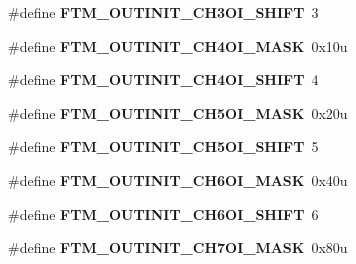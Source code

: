 \begin{DoxyCompactItemize}
\item 
\hypertarget{group___f_t_m___register___masks_ga083d497bae99715e175c5e73e27d3313}{}\#define {\bfseries F\+T\+M\+\_\+\+O\+U\+T\+I\+N\+I\+T\+\_\+\+C\+H3\+O\+I\+\_\+\+S\+H\+I\+F\+T}~3\label{group___f_t_m___register___masks_ga083d497bae99715e175c5e73e27d3313}

\item 
\hypertarget{group___f_t_m___register___masks_gab451c20f7002deae668749b6a886ca84}{}\#define {\bfseries F\+T\+M\+\_\+\+O\+U\+T\+I\+N\+I\+T\+\_\+\+C\+H4\+O\+I\+\_\+\+M\+A\+S\+K}~0x10u\label{group___f_t_m___register___masks_gab451c20f7002deae668749b6a886ca84}

\item 
\hypertarget{group___f_t_m___register___masks_gac61997ec656e9289b6b9b4a6df30b548}{}\#define {\bfseries F\+T\+M\+\_\+\+O\+U\+T\+I\+N\+I\+T\+\_\+\+C\+H4\+O\+I\+\_\+\+S\+H\+I\+F\+T}~4\label{group___f_t_m___register___masks_gac61997ec656e9289b6b9b4a6df30b548}

\item 
\hypertarget{group___f_t_m___register___masks_gaa0956e031b19115b7f91bf0138ef8dfe}{}\#define {\bfseries F\+T\+M\+\_\+\+O\+U\+T\+I\+N\+I\+T\+\_\+\+C\+H5\+O\+I\+\_\+\+M\+A\+S\+K}~0x20u\label{group___f_t_m___register___masks_gaa0956e031b19115b7f91bf0138ef8dfe}

\item 
\hypertarget{group___f_t_m___register___masks_ga7a284efce0663f9bde85b1efc1b1cfd3}{}\#define {\bfseries F\+T\+M\+\_\+\+O\+U\+T\+I\+N\+I\+T\+\_\+\+C\+H5\+O\+I\+\_\+\+S\+H\+I\+F\+T}~5\label{group___f_t_m___register___masks_ga7a284efce0663f9bde85b1efc1b1cfd3}

\item 
\hypertarget{group___f_t_m___register___masks_ga4140f95c3774bb113eba65b099673d64}{}\#define {\bfseries F\+T\+M\+\_\+\+O\+U\+T\+I\+N\+I\+T\+\_\+\+C\+H6\+O\+I\+\_\+\+M\+A\+S\+K}~0x40u\label{group___f_t_m___register___masks_ga4140f95c3774bb113eba65b099673d64}

\item 
\hypertarget{group___f_t_m___register___masks_gae1269df4b4b0084a0e722e688c98abe0}{}\#define {\bfseries F\+T\+M\+\_\+\+O\+U\+T\+I\+N\+I\+T\+\_\+\+C\+H6\+O\+I\+\_\+\+S\+H\+I\+F\+T}~6\label{group___f_t_m___register___masks_gae1269df4b4b0084a0e722e688c98abe0}

\item 
\hypertarget{group___f_t_m___register___masks_ga04c56da93774326348a87fb79211e421}{}\#define {\bfseries F\+T\+M\+\_\+\+O\+U\+T\+I\+N\+I\+T\+\_\+\+C\+H7\+O\+I\+\_\+\+M\+A\+S\+K}~0x80u\label{group___f_t_m___register___masks_ga04c56da93774326348a87fb79211e421}


\end{DoxyCompactItemize}

